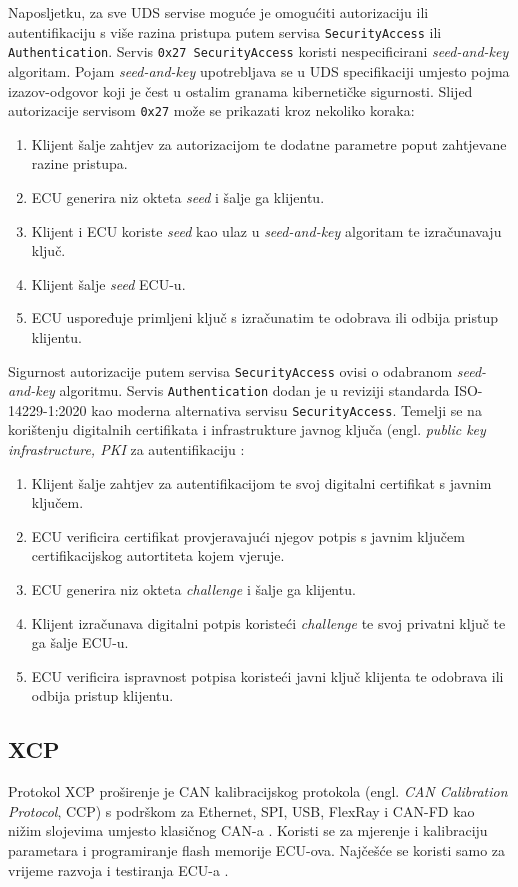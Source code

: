 \documentclass[times, utf8, diplomski, numeric]{fer}
\begin{document}
Naposljetku, za sve UDS servise moguće je omogućiti autorizaciju ili autentifikaciju s više razina pristupa putem servisa \texttt{SecurityAccess} ili \texttt{Authentication}. Servis \texttt{0x27 SecurityAccess} koristi nespecificirani \textit{seed-and-key} algoritam. Pojam \textit{seed-and-key} upotrebljava se u UDS specifikaciji umjesto pojma izazov-odgovor  koji je čest u ostalim granama kibernetičke sigurnosti. Slijed autorizacije servisom \texttt{0x27} može se prikazati kroz nekoliko koraka:
\begin{enumerate}
    \item Klijent šalje zahtjev za autorizacijom te dodatne parametre poput zahtjevane razine pristupa.
    \item ECU generira niz okteta \textit{seed} i šalje ga klijentu.
    \item Klijent i ECU koriste \textit{seed} kao ulaz u \textit{seed-and-key} algoritam te izračunavaju ključ.
    \item Klijent šalje \textit{seed} ECU-u.
    \item ECU uspoređuje primljeni ključ s izračunatim te odobrava ili odbija pristup klijentu.
\end{enumerate}
Sigurnost autorizacije putem servisa \texttt{SecurityAccess} ovisi o odabranom \textit{seed-and-key} algoritmu.
\newpage
Servis \texttt{Authentication} dodan je u reviziji standarda ISO-14229-1:2020 kao moderna alternativa servisu \texttt{SecurityAccess}. Temelji se na korištenju digitalnih certifikata i infrastrukture javnog ključa (engl. \textit{public key infrastructure, PKI} za autentifikaciju \cite{vector2021uds}:
\begin{enumerate}
    \item Klijent šalje zahtjev za autentifikacijom te svoj digitalni certifikat s javnim ključem.
    \item ECU verificira certifikat provjeravajući njegov potpis s javnim ključem certifikacijskog autortiteta kojem vjeruje.
    \item ECU generira niz okteta \textit{challenge} i šalje ga klijentu.
    \item Klijent izračunava digitalni potpis koristeći \textit{challenge} te svoj privatni ključ te ga šalje ECU-u.
    \item ECU verificira ispravnost potpisa koristeći javni ključ klijenta te odobrava ili odbija pristup klijentu.
\end{enumerate}

\subsection{XCP}
Protokol XCP proširenje je CAN kalibracijskog protokola (engl. \textit{CAN Calibration Protocol}, CCP) s podrškom za Ethernet, SPI, USB, FlexRay i CAN-FD kao nižim slojevima umjesto klasičnog CAN-a \cite{falch2022xcp}. Koristi se za mjerenje i kalibraciju parametara i programiranje flash memorije ECU-ova. Najčešće se koristi samo za vrijeme razvoja i testiranja ECU-a \cite{falch2022xcp}.
\end{document}
